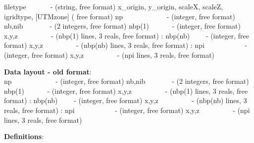 \documentclass{article}
\begin{document}
\noindent
filetype\ \ \ \ \ \ \ {}- (string, free format) \newline
x\_origin, y\_origin, scaleX, scaleZ, igridtype,  [UTMzone] ( free format)\newline
np \ \ \ \ \ \ \ \ \ \ \ \ {}- (integer, free format)\newline
nb,nib \ \ \ \ \ \ \ {}- (2 integers, free format)\newline
nbp(1) \ \ \ \ \ \ {}- (integer, free format)\newline
x,y,z \ \ \ \ \ \ \ \ \ {}- (nbp(1) lines, 3 reals, free format)\newline
:\newline
nbp(nb) \ \ \ \ {}- (integer, free format)\newline
x,y,z \ \ \ \ \ \ \ \ \ {}- (nbp(nb) lines, 3 reals, free format)\newline
:\newline
npi \ \ \ \ \ \ \ \ \ \ \ {}- (integer, free format)\newline
x,y,z \ \ \ \ \ \ \ \ \ {}- (npi lines, 3 reals, free format)\newline

\textbf{Data layout - old format}: \\ 

\noindent
np \ \ \ \ \ \ \ \ \ \ \ \ {}- (integer, free format)\newline
nb,nib \ \ \ \ \ \ \ {}- (2 integers, free format)\newline
nbp(1) \ \ \ \ \ \ {}- (integer, free format)\newline
x,y,z \ \ \ \ \ \ \ \ \ {}- (nbp(1) lines, 3 reals, free format)\newline
:\newline
nbp(nb) \ \ \ \ {}- (integer, free format)\newline
x,y,z \ \ \ \ \ \ \ \ \ {}- (nbp(nb) lines, 3 reals, free format)\newline
:\newline
npi \ \ \ \ \ \ \ \ \ \ \ {}- (integer, free format)\newline
x,y,z \ \ \ \ \ \ \ \ \ {}- (npi lines, 3 reals, free format)\newline

\noindent\textbf{Definitions}:\\ 
\end{document}
